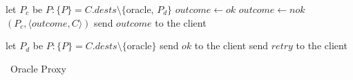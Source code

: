 \begin{algorithm}[h!]
\begin{distribalgo}[1]
            \STATE let $P_c$ be $P : \{P\} = C.dests \setminus \{$oracle, $P_d\}$
                \STATE $outcome \leftarrow ok$
            \ELSE
                \STATE $outcome \leftarrow nok$
            \ENDIF
            \STATE \rmcast$(P_c, \langle outcome, C \rangle )$
            \STATE send $outcome$ to the client
        
        \vspace{1.0mm}
        
            \STATE let $P_d$ be $P : \{P\} = C.dests \setminus \{$oracle$\}$
                \STATE send $ok$    to the client
            \ELSE
                \STATE send $retry$ to the client
            \ENDIF
            
            
        \ENDIF
    \ENDINDENT
\ENDINDENT

\caption{\dssmr\ Oracle Proxy}
\label{alg:oracle_proxy}
\end{distribalgo}
\end{algorithm}
